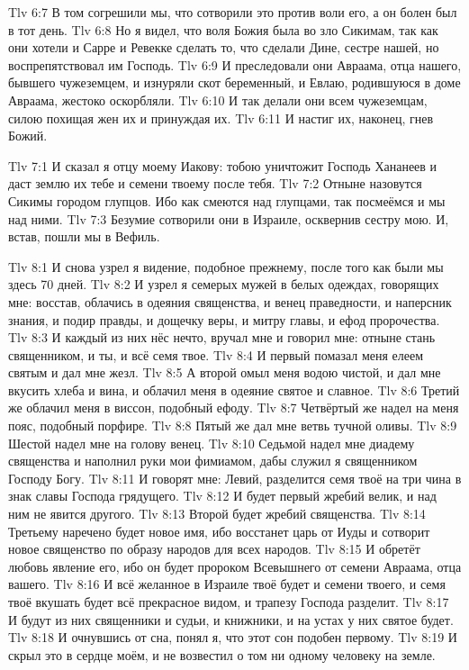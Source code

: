 \vs Tlv 6:7
В том согрешили мы, что сотворили это против воли его, а он болен
был в тот день.
\vs Tlv 6:8
Но я видел, что воля Божия была во зло Сикимам,
так как они хотели и Сарре и Ревекке сделать то,
что сделали Дине, сестре нашей,
но воспрепятствовал им Господь.
\vs Tlv 6:9
И преследовали они Авраама, отца нашего, бывшего чужеземцем,
и изнуряли скот беременный,
и Евлаю, родившуюся в доме Авраама, жестоко оскорбляли.
\vs Tlv 6:10
И так делали они всем чужеземцам,
силою похищая жен их и принуждая их.
\vs Tlv 6:11
И настиг их, наконец, гнев Божий.

\vs Tlv 7:1
И сказал я отцу моему Иакову:
тобою уничтожит Господь Хананеев
и даст землю их тебе и семени твоему после тебя.
\vs Tlv 7:2
Отныне назовутся Сикимы городом глупцов.
Ибо как смеются над глупцами, так посмеёмся и мы над ними.
\vs Tlv 7:3
Безумие сотворили они в Израиле, осквернив сестру мою.
И, встав, пошли мы в Вефиль.

\vs Tlv 8:1
И снова узрел я видение, подобное прежнему,
после того как были мы здесь 70 дней.
\vs Tlv 8:2
И узрел я семерых мужей в белых одеждах, говорящих мне:
восстав, облачись в одеяния священства,
и венец праведности,
и наперсник знания,
и подир правды,
и дощечку веры,
и митру главы,
и ефод пророчества.
\vs Tlv 8:3
И каждый из них нёс нечто, вручал мне и говорил мне:
отныне стань священником, и ты, и всё семя твое.
\vs Tlv 8:4
И первый помазал меня елеем святым и дал мне жезл.
\vs Tlv 8:5
А второй омыл меня водою чистой, и дал мне вкусить хлеба и вина,
и облачил меня в одеяние святое и славное.
\vs Tlv 8:6
Третий же облачил меня в виссон, подобный ефоду.
\vs Tlv 8:7
Четвёртый же надел на меня пояс, подобный порфире.
\vs Tlv 8:8
Пятый же дал мне ветвь тучной оливы.
\vs Tlv 8:9
Шестой надел мне на голову венец.
\vs Tlv 8:10
Седьмой надел мне диадему священства и наполнил руки мои фимиамом,
дабы служил я священником Господу Богу.
\vs Tlv 8:11
И говорят мне: Левий, разделится семя твоё на три чина в знак славы
Господа грядущего.
\vs Tlv 8:12
И будет первый жребий велик, и над ним не явится другого.
\vs Tlv 8:13
Второй будет жребий священства.
\vs Tlv 8:14
Третьему наречено будет новое имя, ибо восстанет
царь от Иуды и сотворит новое священство
по образу народов для всех народов.
\vs Tlv 8:15
И обретёт любовь явление его, ибо он будет
пророком Всевышнего от семени Авраама, отца вашего.
\vs Tlv 8:16
И всё желанное в Израиле твоё будет и семени твоего, и семя твоё
вкушать будет всё прекрасное видом, и трапезу Господа разделит.
\vs Tlv 8:17
И будут из них священники и судьи, и книжники, и на устах у них святое будет.
\vs Tlv 8:18
И очнувшись от сна, понял я, что этот сон подобен первому.
\vs Tlv 8:19
И скрыл это в сердце моём, и не возвестил о том ни одному человеку на земле.

